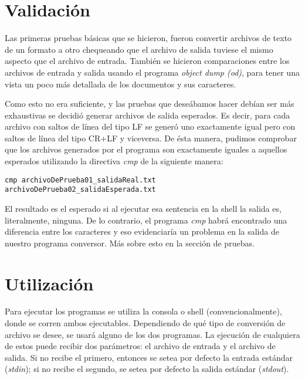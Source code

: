 \documentclass[a4paper,11pt]{article}
\begin{document}
\section{Validación}
Las primeras pruebas básicas que se hicieron, fueron convertir archivos de texto de un formato a otro chequeando que el archivo de salida tuviese el mismo aspecto que el archivo de entrada. También se hicieron comparaciones entre los archivos de entrada y salida usando el programa \textit{object dump (od)}, para tener una vista un poco más detallada de los documentos y sus caracteres.

\indent Como esto no era suficiente, y las pruebas que deseábamos hacer debían ser más exhaustivas se decidió generar archivos de salida esperados. Es decir, para cada archivo con saltos de línea del tipo LF se generó uno exactamente igual pero con saltos de línea del tipo CR+LF y viceversa. De ésta manera, pudimos comprobar que los archivos generados por el programa son exactamente iguales a aquellos esperados utilizando la directiva \textit{cmp} de la siguiente manera:

\begin{verbatim}
cmp archivoDePrueba01_salidaReal.txt archivoDePrueba02_salidaEsperada.txt
\end{verbatim}

\indent El resultado es el esperado si al ejecutar esa sentencia en la shell la salida es, literalmente, ninguna. De lo contrario, el programa \textit{cmp} habrá encontrado una diferencia entre los caracteres y eso evidenciaría un problema en la salida de nuestro programa conversor. Más sobre esto en la sección de pruebas.



\section{Utilización}
Para ejecutar los programas se utiliza la consola o shell (convencionalmente), donde se corren ambos ejecutables. Dependiendo de qué tipo de conversión de archivo se desee, se usará alguno de los dos programas. La ejecución de cualquiera de estos puede recibir dos parámetros: el archivo de entrada y el archivo de salida. Si no recibe el primero, entonces se setea por defecto la entrada estándar (\textit{stdin}); si no recibe el segundo, se setea por defecto la salida estándar (\textit{stdout}).
\end{document}
